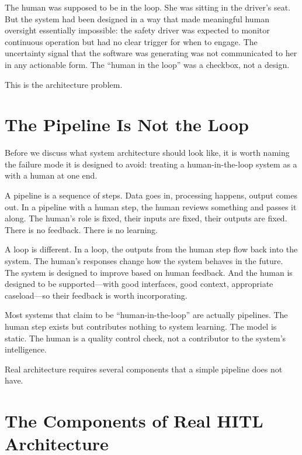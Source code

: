 The human was supposed to be in the loop. She was sitting in the driver's seat. But the system had been designed in a way that made meaningful human oversight essentially impossible: the safety driver was expected to monitor continuous operation but had no clear trigger for when to engage. The uncertainty signal that the software was generating was not communicated to her in any actionable form. The ``human in the loop'' was a checkbox, not a design.

This is the architecture problem.

\section{The Pipeline Is Not the Loop}
\label{sec:ch08-pipeline-vs-loop}

Before we discuss what \hitl system architecture should look like, it is worth naming the failure mode it is designed to avoid: treating a human-in-the-loop system as a  with a human at one end.

A pipeline is a sequence of steps. Data goes in, processing happens, output comes out. In a pipeline with a human step, the human reviews something and passes it along. The human's role is fixed, their inputs are fixed, their outputs are fixed. There is no feedback. There is no learning.

A loop is different. In a loop, the outputs from the human step flow back into the system. The human's responses change how the system behaves in the future. The system is designed to improve based on human feedback. And the human is designed to be supported---with good interfaces, good context, appropriate caseload---so their feedback is worth incorporating.

Most systems that claim to be ``human-in-the-loop'' are actually pipelines. The human step exists but contributes nothing to system learning. The model is static. The human is a quality control check, not a contributor to the system's intelligence.

Real \hitl architecture requires several components that a simple pipeline does not have.

\section{The Components of Real HITL Architecture}
\label{sec:ch08-components}

